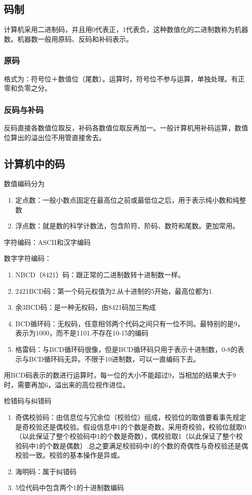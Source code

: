 \documentclass{ctexart}
\begin{document}
\subsection{码制}
计算机采用二进制码，并且用0代表正，1代表负，这种数值化的二进制数称为机器数。机器数一般用原码、反码和补码表示。
\subsubsection{原码}
格式为：符号位＋数值位（尾数）。运算时，符号位不参与运算，单独处理。有正零和负零之分。
\subsubsection{反码与补码}
{\color{red}{正数的反码与补码都与原码一样！}}反码直接各数值位取反，补码各数值位取反再加一。一般计算机用补码运算，数值位算出的溢出位不用管直接舍去。
\subsection{计算机中的码}
数值编码分为
\begin{enumerate}
    \item 定点数：一般小数点固定在最高位之前或最低位之后，用于表示纯小数和纯整数
    \item 浮点数：就是数的科学计数法，包含阶符、阶码、数符和尾数。更加常用。
\end{enumerate}
字符编码：ASCII和汉字编码

数字字符编码：
\begin{enumerate}
    \item NBCD（8421）码：跟正常的二进制数转十进制数一样。{\color{red}{注意：这里针对的是一个个的数字字符，比如十进制的10，表示为二进制数为1010，表示为8421BCD码就是00010000.}}
    \item 2421BCD码：第一个码元权值为2.从十进制的5开始，最高位都为1.
    \item 余3BCD码：是一种无权码，由8421码加三构成
    \item BCD循环码：无权码，任意相邻两个代码之间只有一位不同。最特别的是9，表示为1000，而不是1101.不存在10-15的编码
    \item 格雷码：与BCD循环码很像，但是BCD循环码只用于表示十进制数，0-8的表示与BCD循环码无异。不限于10进制数，可以一直编码下去。
\end{enumerate}
用BCD码表示的数进行运算时，每一位的大小不能超过9，当相加的结果大于9时，需要再加6，溢出来的高位视作进位。

检错码与纠错码
\begin{enumerate}
    \item 奇偶校验码：由信息位与冗余位（校验位）组成，校验位的取值要看事先规定是奇校验还是偶校验。假设信息中1的个数是奇数，采用奇校验，校验位就取0（以此保证了整个校验码中1的个数是奇数），偶校验取1（以此保证了整个校验码中1的个数是偶数）.总之要满足校验码中1的个数的奇偶性与奇校验还是偶校验一致。校验的基本操作是异或。
    \item 海明码：属于纠错码
    \item 5位代码中包含两个1的十进制数编码
\end{enumerate}
\end{document}
